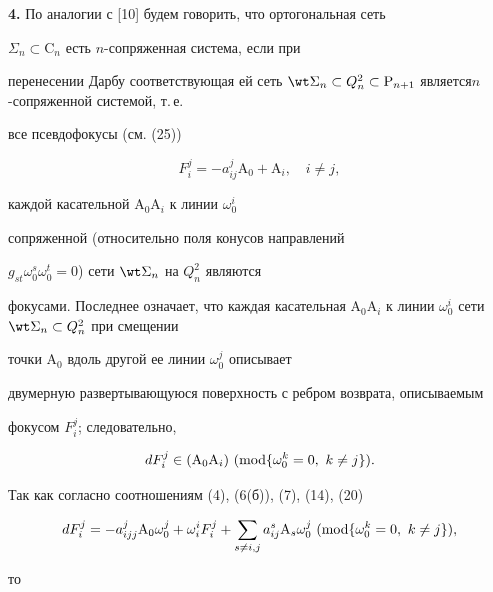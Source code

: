 \medskip 


 


{\bf 4.} По аналогии с [10] будем говорить, что ортогональная сеть 


$\Sigma_n\subset\mathrm C_n$ есть $n$-сопряженная система, если при 


перенесении Дарбу соответствующая ей сеть $\wt\Sigma_n\subset 


Q^2_n\subset \mathrm P_{n+1}$ является\linebreak $n$-сопряженной системой, т.\,е. 


все псевдофокусы (см. (25)) 


$$ 


F^j_i=-a^j_{ij}\mathrm A_0+\mathrm A_i,\quad i\ne j, 


$$ 


каждой касательной $\mathrm A_0\mathrm A_i$ к линии $\omega^i_0$ 


сопряженной (относительно поля конусов направлений 


$g_{st}\omega^s_0\omega^t_0=0$) сети $\wt\Sigma_n$ на $Q^2_n$ являются 


фокусами. Последнее означает, что каждая касательная $\mathrm A_0\mathrm 


A_i$ к линии $\omega^i_0$ сети $\wt\Sigma_n\subset Q^2_n$ при смещении 


точки $\mathrm A_0$ вдоль другой ее линии $\omega^j_0$ описывает 


двумерную развертывающуюся поверхность с ребром возврата, описываемым 


фокусом $F^j_i$; следовательно,


$$ 


dF^j_i\in(\mathrm A_0\mathrm A_i)\ (\Mod\{\omega^k_0=0, 


\ k\ne j\}). 


$$ 


 


Так как согласно соотношениям (4), (6(б)), (7), (14), (20) 


$$ 


dF^j_i=-a^j_{ijj}\mathrm A_0\omega^j_0+\omega^i_i F^j_i+ 


\sum_{s\ne i,j}a^s_{ij}\mathrm A_s\omega^j_0 


\ (\Mod\{\omega^k_0=0,\ k\ne j\}), 


$$ 


то 


